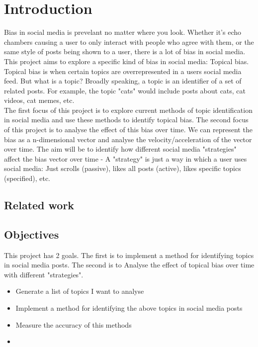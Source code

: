\chapter{Introduction}
\label{ch:introduction}

Bias in social media is prevelant no matter where you look. Whether it's echo chambers causing a user to only interact with
people who agree with them, or the same style of posts being shown to a user, there is a lot of bias in social media.\\

This project aims to explore a specific kind of bias in social media: Topical bias. Topical bias is when certain topics
are overrepresented in a users social media feed. But what is a topic? Broadly speaking, a topic is an identifier
of a set of related posts. For example, the topic "cats" would include posts about cats, cat videos, cat memes, etc.\\

The first focus of this project is to explore current methods of topic identification in social media and use
these methods to identify topical bias. The second focus of this project is to analyse the effect of this bias over time.
We can represent the bias as a n-dimensional vector and analyse the velocity/acceleration of the vector over time. The aim
will be to identify how different social media "strategies" affect the bias vector over time - A "strategy" is just a way in
which a user uses social media: Just scrolls (passive), likes all posts (active), likes specific topics (specified), etc.

\section{Related work}

\section{Objectives}

This project has 2 goals. The first is to implement a method for identifying topics in social media posts. The second is to
Analyse the effect of topical bias over time with different "strategies".

\begin{itemize}
    \item Generate a list of topics I want to analyse
    \item Implement a method for identifying the above topics in social media posts
    \item Measure the accuracy of this methods
    \item 
\end{itemize}